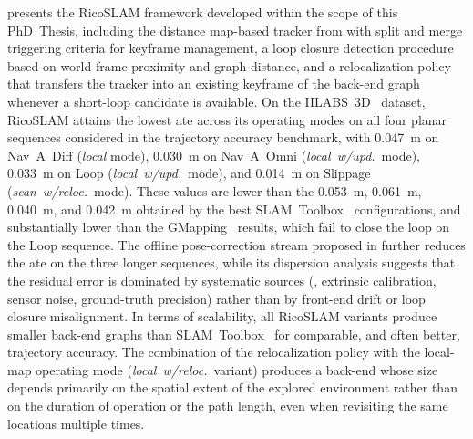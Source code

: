  presents the RicoSLAM framework developed within the scope
of this PhD~Thesis, including the distance map-based tracker from
 with split and merge triggering criteria for
keyframe management, a loop closure detection procedure based on world-frame
proximity and graph-distance, and a relocalization policy that
transfers the tracker into an existing keyframe of the back-end graph
whenever a short-loop candidate is available. On the
IILABS~3D~\cite{ribeiro:access:2025} dataset, RicoSLAM attains the
lowest \gls{ate} across its operating modes on all four planar
sequences considered in the trajectory accuracy benchmark, with
\SI{0.047}{\metre} on Nav~A~Diff (\emph{local} mode),
\SI{0.030}{\metre} on Nav~A~Omni (\emph{local~w/upd.}\ mode),
\SI{0.033}{\metre} on Loop (\emph{local~w/upd.}\ mode), and
\SI{0.014}{\metre} on Slippage (\emph{scan~w/reloc.}\ mode). These
values are lower than the \SI{0.053}{\metre}, \SI{0.061}{\metre},
\SI{0.040}{\metre}, and \SI{0.042}{\metre} obtained by the best
SLAM~Toolbox~\cite{macenski-jambrecic:joss:2021} configurations, and
substantially lower than the GMapping~\cite{grisetti:tro:2007}
results, which fail to close the loop on the Loop sequence.
The offline pose-correction stream proposed in
 further reduces the \gls{ate} on
the three longer sequences, while its dispersion analysis suggests
that the residual error is dominated by systematic sources
(\eg, extrinsic calibration, sensor noise, ground-truth precision)
rather than by front-end drift or loop closure misalignment. In
terms of scalability, all RicoSLAM variants produce smaller back-end graphs than
SLAM~Toolbox~\cite{macenski-jambrecic:joss:2021} for comparable, and
often better, trajectory accuracy. The combination of the
relocalization policy with the local-map operating mode
(\emph{local~w/reloc.}\ variant) produces a back-end whose size
depends primarily on the spatial extent of the explored environment
rather than on the duration of operation or the path length, even
when revisiting the same locations multiple times.

